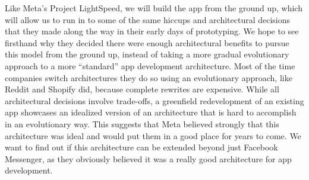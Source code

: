 \documentclass[12pt]{article}
\begin{document}
    Like Meta's Project LightSpeed, we will build the app from the ground up, which will allow us to run in to some of the same hiccups and architectural decisions that they made along the way in their early days of prototyping.
    We hope to see firsthand why they decided there were enough architectural benefits to pursue this model from the ground up, instead of taking a more gradual evolutionary approach to a more “standard” app development architecture.
    Most of the time companies switch architectures they do so using an evolutionary approach, like Reddit and Shopify did, because complete rewrites are expensive.
    While all architectural decisions involve trade-offs, a greenfield redevelopment of an existing app showcases an idealized version of an architecture that is hard to accomplish in an evolutionary way.
    This suggests that Meta believed strongly that this architecture was ideal and would put them in a good place for years to come.
    We want to find out if this architecture can be extended beyond just Facebook Messenger, as they obviously believed it was a really good architecture for app development.

\end{document}
